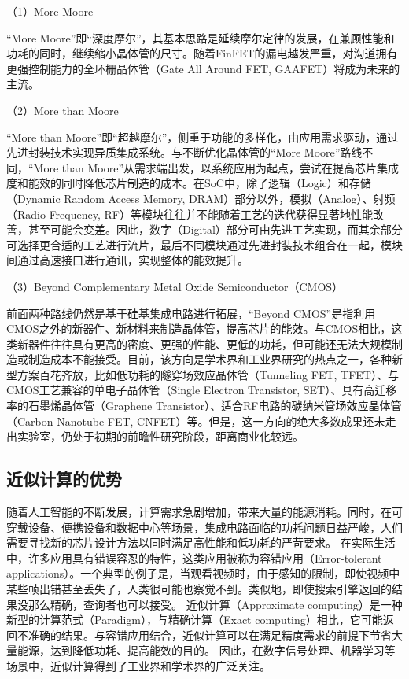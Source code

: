 （1）More Moore\cite{more_moore}

“More Moore”即“深度摩尔”，其基本思路是延续摩尔定律的发展，在兼顾性能和功耗的同时，继续缩小晶体管的尺寸。随着FinFET的漏电越发严重，对沟道拥有更强控制能力的全环栅晶体管（Gate All Around FET, GAAFET）将成为未来的主流\cite{GAA}。

（2）More than Moore\cite{more_than_moore}

“More than Moore”即“超越摩尔”，侧重于功能的多样化，由应用需求驱动，通过先进封装技术实现异质集成系统。与不断优化晶体管的“More Moore”路线不同，“More than Moore”从需求端出发，以系统应用为起点，尝试在提高芯片集成度和能效的同时降低芯片制造的成本。在SoC中，除了逻辑（Logic）和存储（Dynamic Random Access Memory, DRAM）部分以外，模拟（Analog）、射频（Radio Frequency, RF）等模块往往并不能随着工艺的迭代获得显著地性能改善，甚至可能会变差。因此，数字（Digital）部分可由先进工艺实现，而其余部分可选择更合适的工艺进行流片，最后不同模块通过先进封装技术组合在一起，模块间通过高速接口进行通讯，实现整体的能效提升。


（3）Beyond Complementary Metal Oxide Semiconductor（CMOS）\cite{beyond_cmos}

前面两种路线仍然是基于硅基集成电路进行拓展，“Beyond CMOS”是指利用CMOS之外的新器件、新材料来制造晶体管，提高芯片的能效。与CMOS相比，这类新器件往往具有更高的密度、更强的性能、更低的功耗，但可能还无法大规模制造或制造成本不能接受。目前，该方向是学术界和工业界研究的热点之一，各种新型方案百花齐放，比如低功耗的隧穿场效应晶体管（Tunneling FET, TFET）\cite{TFET}、与CMOS工艺兼容的单电子晶体管（Single Electron Transistor, SET）\cite{SET}、具有高迁移率的石墨烯晶体管（Graphene Transistor）\cite{Graphene_transistor}、适合RF电路的碳纳米管场效应晶体管（Carbon Nanotube FET, CNFET）\cite{Carbon_Nanotube_FET}等。但是，这一方向的绝大多数成果还未走出实验室，仍处于初期的前瞻性研究阶段，距离商业化较远。

\subsection{近似计算的优势} \label{approximate_computing_advance}

随着人工智能的不断发展，计算需求急剧增加，带来大量的能源消耗。同时，在可穿戴设备、便携设备和数据中心等场景，集成电路面临的功耗问题日益严峻，人们需要寻找新的芯片设计方法以同时满足高性能和低功耗的严苛要求。
在实际生活中，许多应用具有错误容忍的特性，这类应用被称为容错应用（Error-tolerant applications）。一个典型的例子是，当观看视频时，由于感知的限制，即使视频中某些帧出错甚至丢失了，人类很可能也察觉不到。类似地，即使搜索引擎返回的结果没那么精确，查询者也可以接受。
近似计算（Approximate computing）是一种新型的计算范式（Paradigm），与精确计算（Exact computing）相比，它可能返回不准确的结果。与容错应用结合，近似计算可以在满足精度需求的前提下节省大量能源，达到降低功耗、提高能效的目的。
因此，在数字信号处理、机器学习等场景中，近似计算得到了工业界和学术界的广泛关注\cite{AC:survey:survey's_survey,AC:survey:hanjie_2013_ETS}。

